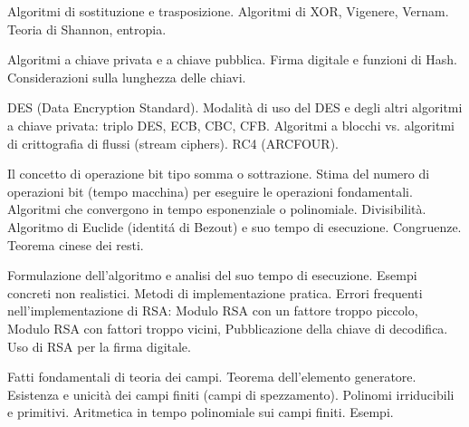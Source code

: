      
\def\abbrcorso{MA2}  
\def\titolocorso{Matematica Applicata: Laboratorio 2}
\def\sottotitolo{Introduzione alla Crittografia} 
\def\docente{Prof. Alberto Berretti e Prof. Francesco Pappalardi}  
\def\crediti{7.5}   
\def\semestre{II}
\def\esoneri{0}
\def\scrittofinale{1}
\def\oralefinale{0}
\def\altreprove{1}

\Intestazione   
{}

Algoritmi di sostituzione e trasposizione. Algoritmi di XOR,
Vigenere, Vernam. Teoria di Shannon, entropia.


Algoritmi a chiave privata e a chiave pubblica. Firma digitale 
e funzioni di Hash. Considerazioni sulla lunghezza delle chiavi.


DES (Data Encryption Standard). Modalit\`a di uso del DES
e degli altri algoritmi a chiave privata: triplo DES, ECB, 
CBC, CFB. Algoritmi a blocchi vs. algoritmi di crittografia
di flussi (stream ciphers). RC4 (ARCFOUR).


Il concetto di operazione bit tipo somma o sottrazione. Stima 
del numero di operazioni bit (tempo macchina) per eseguire 
le operazioni fondamentali. Algoritmi che convergono in tempo 
esponenziale o polinomiale. Divisibilit\`a. Algoritmo di Euclide
(identit\'a di Bezout) e suo tempo di esecuzione. Congruenze.
Teorema cinese dei resti.


Formulazione dell'algoritmo e analisi del suo tempo di esecuzione.
Esempi concreti non realistici. Metodi di implementazione pratica.
Errori frequenti nell'implementazione di RSA: Modulo RSA con un
fattore troppo piccolo, Modulo RSA con fattori troppo vicini,
Pubblicazione della chiave di decodifica. Uso di RSA per la firma
digitale.


Fatti fondamentali di teoria dei campi. Teorema dell'elemento generatore.
Esistenza e unicit\`a dei campi finiti (campi di spezzamento). Polinomi 
irriducibili e primitivi. Aritmetica in tempo polinomiale sui
campi finiti. Esempi.


